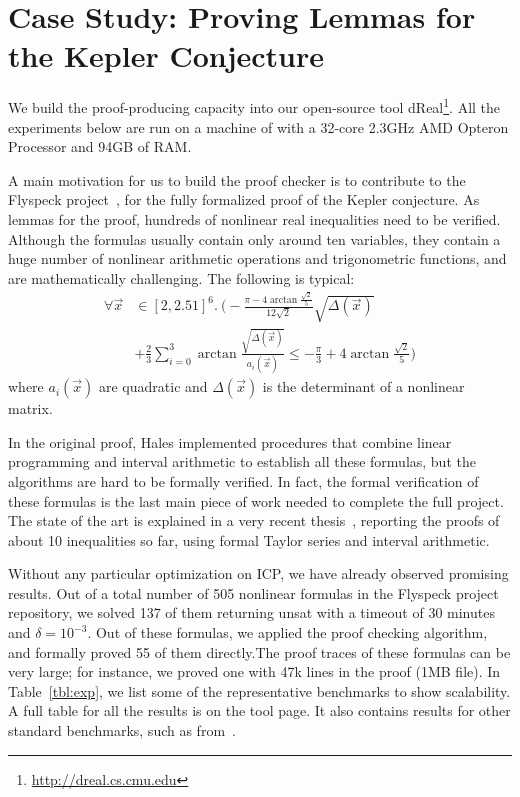 \documentclass[12pt]{article}
\begin{document}
\section{Case Study: Proving Lemmas for the Kepler Conjecture}\label{kepler}

We build the proof-producing capacity into our open-source tool
{\sf dReal}\footnote{
\url{http://dreal.cs.cmu.edu}
}. All the experiments below are run on a
machine of with a 32-core 2.3GHz AMD Opteron Processor and 94GB of RAM.

A main motivation for us to build
the proof checker is to contribute to the Flyspeck
project~\cite{DBLP:conf/dagstuhl/Hales05}, for the
fully formalized proof of the Kepler conjecture. As lemmas for the proof,
hundreds of nonlinear real inequalities need to be verified. Although the
formulas usually contain only around ten variables, they contain a huge number
of nonlinear arithmetic operations and trigonometric functions, and are
mathematically challenging.
The following is typical:
\begin{align*}
\forall \vec x&\in [2, 2.51]^6.\ \Big( -\frac{\pi-4\arctan\frac{\sqrt
2}{5}}{12\sqrt2}\sqrt{\Delta(\vec x)}\\
&+\frac{2}{3}\sum_{i=0}^3\arctan\frac{\sqrt{\Delta(\vec x)}}{a_i(\vec x)}\leq
-\frac{\pi}{3}+4\arctan\frac{\sqrt 2}{5}\Big)
\end{align*}
where $a_i(\vec x)$ are quadratic and $\Delta(\vec x)$ is the
determinant of a nonlinear matrix.

In the original proof, Hales implemented
procedures that combine linear programming and interval arithmetic to
establish all these formulas, but the algorithms are hard to be formally
verified. In fact, the formal verification of these formulas is the last main
piece of work needed to complete the full project. The state of the art is
explained in a very recent thesis~\cite{keplerthesis}, reporting the proofs of
about 10 inequalities so far, using formal Taylor
series and interval arithmetic.

Without any particular optimization on ICP, we have already observed promising
results. Out of a total number of 505 nonlinear formulas in the Flyspeck project
repository, we solved
137 of them returning {\sf unsat} with a timeout of 30 minutes and
$\delta=10^{-3}$. Out of these formulas, we applied the proof checking
algorithm, and formally proved 55 of them directly.The proof traces of these
formulas can be very large; for
instance, we proved one with 47k lines in the proof (1MB file). In
Table~\ref{tbl:exp}, we list some of the representative benchmarks to show
scalability. A full table for all the results is on the tool page. It also
contains results for other standard benchmarks, such as
from~\cite{DBLP:conf/cade/JovanovicM12}.
\end{document}
